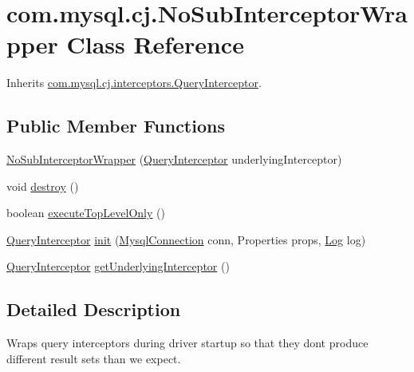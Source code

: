 \hypertarget{classcom_1_1mysql_1_1cj_1_1_no_sub_interceptor_wrapper}{}\section{com.\+mysql.\+cj.\+No\+Sub\+Interceptor\+Wrapper Class Reference}
\label{classcom_1_1mysql_1_1cj_1_1_no_sub_interceptor_wrapper}


Inherits \mbox{\hyperlink{interfacecom_1_1mysql_1_1cj_1_1interceptors_1_1_query_interceptor}{com.\+mysql.\+cj.\+interceptors.\+Query\+Interceptor}}.

\subsection*{Public Member Functions}
\begin{DoxyCompactItemize}
\item 
\mbox{\hyperlink{classcom_1_1mysql_1_1cj_1_1_no_sub_interceptor_wrapper_a16d59d2656f58460d8d986caf02508ff}{No\+Sub\+Interceptor\+Wrapper}} (\mbox{\hyperlink{interfacecom_1_1mysql_1_1cj_1_1interceptors_1_1_query_interceptor}{Query\+Interceptor}} underlying\+Interceptor)
\item 
void \mbox{\hyperlink{classcom_1_1mysql_1_1cj_1_1_no_sub_interceptor_wrapper_a196b252abd96fbdd70d0dd6f844145b8}{destroy}} ()
\item 
boolean \mbox{\hyperlink{classcom_1_1mysql_1_1cj_1_1_no_sub_interceptor_wrapper_a84d3030e0055b60ed0bb2b56fd5a0dbe}{execute\+Top\+Level\+Only}} ()
\item 
\mbox{\hyperlink{interfacecom_1_1mysql_1_1cj_1_1interceptors_1_1_query_interceptor}{Query\+Interceptor}} \mbox{\hyperlink{classcom_1_1mysql_1_1cj_1_1_no_sub_interceptor_wrapper_a1d037e783990bcd80c1ce5a16a1cf254}{init}} (\mbox{\hyperlink{interfacecom_1_1mysql_1_1cj_1_1_mysql_connection}{Mysql\+Connection}} conn, Properties props, \mbox{\hyperlink{interfacecom_1_1mysql_1_1cj_1_1log_1_1_log}{Log}} log)
\item 
\mbox{\hyperlink{interfacecom_1_1mysql_1_1cj_1_1interceptors_1_1_query_interceptor}{Query\+Interceptor}} \mbox{\hyperlink{classcom_1_1mysql_1_1cj_1_1_no_sub_interceptor_wrapper_ab3778df7a64125bbc4121fa747c6b5a4}{get\+Underlying\+Interceptor}} ()
\end{DoxyCompactItemize}


\subsection{Detailed Description}
Wraps query interceptors during driver startup so that they don\textquotesingle{}t produce different result sets than we expect. 

